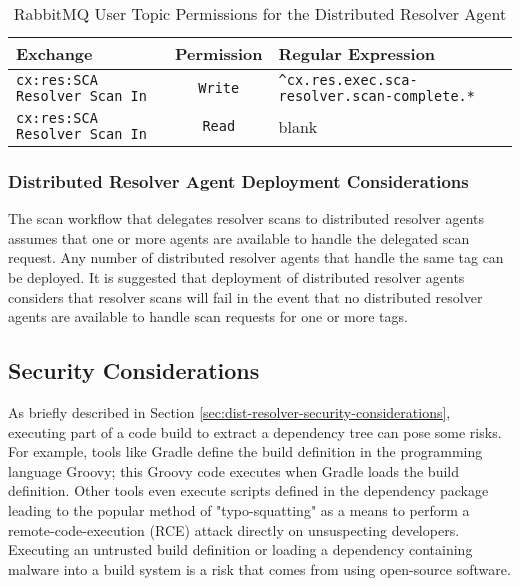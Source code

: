 \begin{table}[ht]
  \caption{RabbitMQ User Topic Permissions for the Distributed Resolver Agent}  
  \label{tab:agent-mq-topic-perms}      
  \begin{tabularx}{\textwidth}{lcl}
      \toprule
      \textbf{Exchange} & \textbf{Permission} & \textbf{Regular Expression} \\
      \midrule
      \texttt{cx:res:SCA Resolver Scan In} & \texttt{Write} & \texttt{\^{}cx.res.exec.sca-resolver.scan-complete.*}\\
      \midrule
      \texttt{cx:res:SCA Resolver Scan In} & \texttt{Read} & blank \\
      \midrule
      \bottomrule
  \end{tabularx}
\end{table}

\subsubsection{Distributed Resolver Agent Deployment Considerations}

The \cxoneflow scan workflow that delegates resolver scans to distributed resolver agents
assumes that one or more agents are available to handle the delegated scan request. Any number
of distributed resolver agents that handle the same tag can be deployed.  It is suggested that
deployment of distributed resolver agents considers that resolver scans will fail in the event
that no distributed resolver agents are available to handle scan requests for one or more
tags.


\subsection{Security Considerations}\label{sec:resolver-agent-security}

As briefly described in Section \ref{sec:dist-resolver-security-considerations}, executing
part of a code build to extract a dependency tree can pose some risks. For example,
tools like Gradle define the build definition in the programming language Groovy; this Groovy
code executes when Gradle loads the build definition.  Other tools even execute scripts defined
in the dependency package leading to the popular method of "typo-squatting" as a means to
perform a remote-code-execution (RCE) attack directly on unsuspecting developers.  Executing an
untrusted build definition or loading a dependency containing malware into a build system is
a risk that comes from using open-source software.

